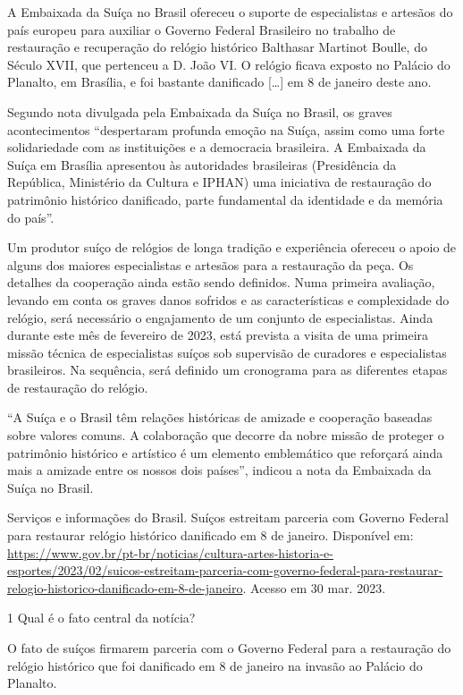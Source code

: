 \begin{itemize}
\begin{itemize}
{\begin{itemize}
\begin{itemize}
A Embaixada da Suíça no Brasil ofereceu o suporte de especialistas e
artesãos do país europeu para auxiliar o Governo Federal Brasileiro no
trabalho de restauração e recuperação do relógio histórico Balthasar
Martinot Boulle, do Século XVII, que pertenceu a D. João VI. O relógio
ficava exposto no Palácio do Planalto, em Brasília, e foi bastante
danificado {[}\ldots{}{]} em 8 de janeiro deste ano.

Segundo nota divulgada pela Embaixada da Suíça no Brasil, os graves
acontecimentos ``despertaram profunda emoção na Suíça, assim como uma
forte solidariedade com as instituições e a democracia brasileira. A
Embaixada da Suíça em Brasília apresentou às autoridades brasileiras
(Presidência da República, Ministério da Cultura e IPHAN) uma iniciativa
de restauração do patrimônio histórico danificado, parte fundamental da
identidade e da memória do país''.

Um produtor suíço de relógios de longa tradição e experiência ofereceu o
apoio de alguns dos maiores especialistas e artesãos para a restauração
da peça. Os detalhes da cooperação ainda estão sendo definidos. Numa
primeira avaliação, levando em conta os graves danos sofridos e as
características e complexidade do relógio, será necessário o engajamento
de um conjunto de especialistas. Ainda durante este mês de fevereiro de
2023, está prevista a visita de uma primeira missão técnica de
especialistas suíços sob supervisão de curadores e especialistas
brasileiros. Na sequência, será definido um cronograma para as
diferentes etapas de restauração do relógio.

``A Suíça e o Brasil têm relações históricas de amizade e cooperação
baseadas sobre valores comuns. A colaboração que decorre da nobre missão
de proteger o patrimônio histórico e artístico é um elemento emblemático
que reforçará ainda mais a amizade entre os nossos dois países'',
indicou a nota da Embaixada da Suíça no Brasil.

Serviços e informações do Brasil. Suíços estreitam parceria com Governo
Federal para restaurar relógio histórico danificado em 8 de janeiro.
Disponível em:
\url{https://www.gov.br/pt-br/noticias/cultura-artes-historia-e-esportes/2023/02/suicos-estreitam-parceria-com-governo-federal-para-restaurar-relogio-historico-danificado-em-8-de-janeiro}.
Acesso em 30 mar. 2023.

\num{1} Qual é o fato central da notícia? 

O fato de suíços firmarem parceria com o Governo Federal para a
restauração do relógio histórico que foi danificado em 8 de janeiro na
invasão ao Palácio do Planalto.


\end{itemize}
\end{itemize}}
\end{itemize}
\end{itemize}
